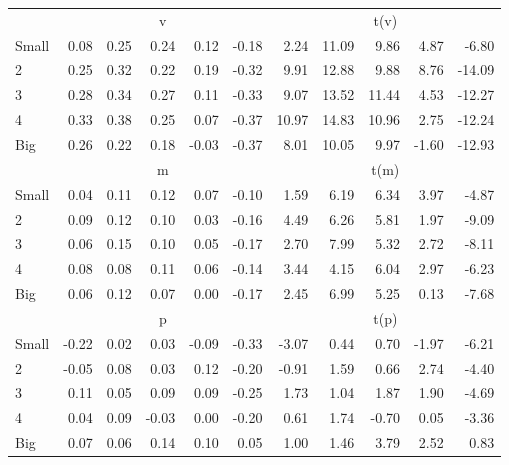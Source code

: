 \begin{table}[!ht]
\begin{tabular}{lrrrrrrrrrr}
  
     & \multicolumn{5}{c}{v} & \multicolumn{5}{c}{t(v)}   \\
     \cmidrule(r){2-6} \cmidrule(r){7-11} 
    Small  & 0.08  & 0.25  & 0.24  & 0.12  & -0.18  & 2.24  & 11.09  & 9.86  & 4.87  & -6.80   \\
    2  & 0.25  & 0.32  & 0.22  & 0.19  & -0.32  & 9.91  & 12.88  & 9.88  & 8.76  & -14.09   \\
    3  & 0.28  & 0.34  & 0.27  & 0.11  & -0.33  & 9.07  & 13.52  & 11.44  & 4.53  & -12.27   \\
    4  & 0.33  & 0.38  & 0.25  & 0.07  & -0.37  & 10.97  & 14.83  & 10.96  & 2.75  & -12.24   \\
    Big  & 0.26  & 0.22  & 0.18  & -0.03  & -0.37  & 8.01  & 10.05  & 9.97  & -1.60  & -12.93   \\
    
  
     & \multicolumn{5}{c}{m} & \multicolumn{5}{c}{t(m)}   \\
     \cmidrule(r){2-6} \cmidrule(r){7-11} 
    Small  & 0.04  & 0.11  & 0.12  & 0.07  & -0.10  & 1.59  & 6.19  & 6.34  & 3.97  & -4.87   \\
    2  & 0.09  & 0.12  & 0.10  & 0.03  & -0.16  & 4.49  & 6.26  & 5.81  & 1.97  & -9.09   \\
    3  & 0.06  & 0.15  & 0.10  & 0.05  & -0.17  & 2.70  & 7.99  & 5.32  & 2.72  & -8.11   \\
    4  & 0.08  & 0.08  & 0.11  & 0.06  & -0.14  & 3.44  & 4.15  & 6.04  & 2.97  & -6.23   \\
    Big  & 0.06  & 0.12  & 0.07  & 0.00  & -0.17  & 2.45  & 6.99  & 5.25  & 0.13  & -7.68   \\
    
  
     & \multicolumn{5}{c}{p} & \multicolumn{5}{c}{t(p)}   \\
     \cmidrule(r){2-6} \cmidrule(r){7-11} 
    Small  & -0.22  & 0.02  & 0.03  & -0.09  & -0.33  & -3.07  & 0.44  & 0.70  & -1.97  & -6.21   \\
    2  & -0.05  & 0.08  & 0.03  & 0.12  & -0.20  & -0.91  & 1.59  & 0.66  & 2.74  & -4.40   \\
    3  & 0.11  & 0.05  & 0.09  & 0.09  & -0.25  & 1.73  & 1.04  & 1.87  & 1.90  & -4.69   \\
    4  & 0.04  & 0.09  & -0.03  & 0.00  & -0.20  & 0.61  & 1.74  & -0.70  & 0.05  & -3.36   \\
    Big  & 0.07  & 0.06  & 0.14  & 0.10  & 0.05  & 1.00  & 1.46  & 3.79  & 2.52  & 0.83   \\
    
  
  \bottomrule
\end{tabular}
\label{tbl:25_Size_Inv_B16}
\end{table}